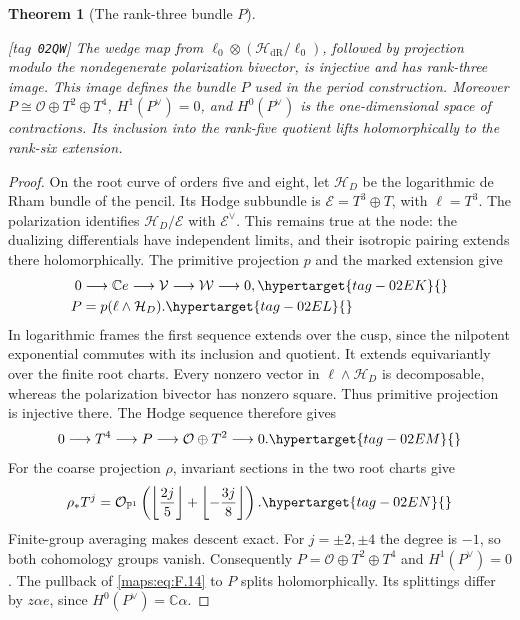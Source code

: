 \documentclass[11pt,a4paper]{article}
\numberwithin{equation}{section}
\newtheorem{theorem}{Theorem}[section]
\theoremstyle{definition}
\newcommand{\StatementRecord}[4]{{\upshape\footnotesize[tag~\texttt{#3}]}\enspace\ignorespaces}
\begin{document}
\begin{theorem}[The rank-three bundle $P$]\hypertarget{tag-02QW}{}\label{night:P1.5}
\StatementRecord{night:P1.5}{proved}{02QW}{the definitions and constructions stated in the proof}
The wedge map from
$\ell_0\otimes(\mathcal H_{\mathrm{dR}}/\ell_0)$, followed by
projection modulo the nondegenerate polarization bivector, is
injective and has rank-three image. This image defines the bundle
$P$ used in the period construction.
Moreover
$P\cong\mathcal O\oplus T^2\oplus T^4$,
$H^1(P^\vee)=0$, and $H^0(P^\vee)$ is the one-dimensional
space of contractions. Its inclusion into the rank-five quotient
lifts holomorphically to the rank-six extension.
\end{theorem}
\begin{proof}
On the root curve of orders five and eight, let $\mathcal H_D$ be
the logarithmic de Rham bundle of the pencil. Its Hodge subbundle is
$\mathcal E=T^3\oplus T$, with $\ell=T^3$. The polarization identifies
$\mathcal H_D/\mathcal E$ with $\mathcal E^\vee$. This remains true
at the node: the dualizing differentials have independent limits,
and their isotropic pairing extends there holomorphically.
The primitive projection $p$ and the marked extension give
\begin{align}
 0&\longrightarrow\mathbb C e\longrightarrow\mathcal V
   \longrightarrow\mathcal W\longrightarrow0,
 \hypertarget{tag-02EK}{}\label{maps:eq:F.14}\\
 P&=p(\ell\wedge\mathcal H_D).
 \hypertarget{tag-02EL}{}\label{maps:eq:F.15}
\end{align}
In logarithmic frames the first sequence extends over the cusp,
since the nilpotent exponential commutes with its inclusion and
quotient. It extends equivariantly over the finite root charts.
Every nonzero vector in $\ell\wedge\mathcal H_D$ is decomposable, whereas the polarization bivector has nonzero square. Thus primitive projection is injective there. The Hodge sequence therefore gives
\begin{equation}
 0\longrightarrow T^4\longrightarrow P
   \longrightarrow\mathcal O\oplus T^2\longrightarrow0.
 \hypertarget{tag-02EM}{}\label{maps:eq:F.16}
\end{equation}
For the coarse projection $\rho$, invariant sections in the two
root charts give
\begin{equation}
 \rho_*T^j=\mathcal O_{\mathbb P^1}
 \left(\left\lfloor\frac{2j}{5}\right\rfloor+
       \left\lfloor-\frac{3j}{8}\right\rfloor\right).
 \hypertarget{tag-02EN}{}\label{maps:eq:F.17}
\end{equation}
Finite-group averaging makes descent exact. For $j=\pm2,\pm4$
the degree is $-1$, so both cohomology groups vanish. Consequently
$P=\mathcal O\oplus T^2\oplus T^4$ and
$H^1(P^\vee)=0$. The pullback of \eqref{maps:eq:F.14} to $P$
splits holomorphically. Its splittings differ by $z\alpha e$,
since $H^0(P^\vee)=\mathbb C\alpha$.
\end{proof}
\end{document}
